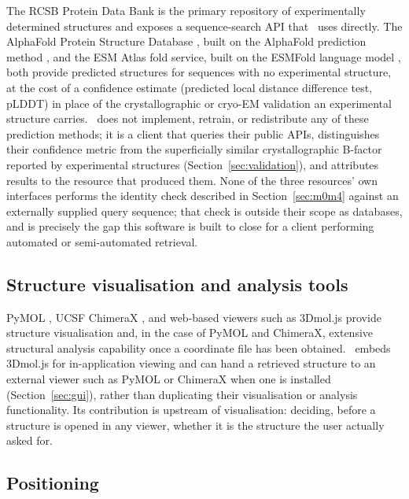The RCSB Protein Data Bank \citep{berman2000pdb} is the primary repository of
experimentally determined structures and exposes a sequence-search API that
\bsi\ uses directly. The AlphaFold Protein Structure Database
\citep{varadi2022alphafolddb}, built on the AlphaFold prediction method
\citep{jumper2021alphafold}, and the ESM Atlas fold service, built on the
ESMFold language model \citep{lin2023esmfold}, both provide predicted
structures for sequences with no experimental structure, at the cost of a
confidence estimate (predicted local distance difference test, pLDDT) in
place of the crystallographic or cryo-EM validation an experimental
structure carries. \bsi\ does not implement, retrain, or redistribute any of
these prediction methods; it is a client that queries their public APIs,
distinguishes their confidence metric from the superficially similar
crystallographic B-factor reported by experimental structures
(Section~\ref{sec:validation}), and attributes results to the resource that
produced them. None of the three resources' own interfaces performs the
identity check described in Section~\ref{sec:m0m4} against an
externally supplied query sequence; that check is outside their scope as
databases, and is precisely the gap this software is built to close for a
client performing automated or semi-automated retrieval.

\subsection{Structure visualisation and analysis tools}

PyMOL \citep{pymol}, UCSF ChimeraX \citep{pettersen2021chimerax}, and web-based
viewers such as 3Dmol.js \citep{rego20153dmol} provide structure
visualisation and, in the case of PyMOL and ChimeraX, extensive structural
analysis capability once a coordinate file has been obtained. \bsi\ embeds
3Dmol.js for in-application viewing and can hand a retrieved structure to an
external viewer such as PyMOL or ChimeraX when one is installed
(Section~\ref{sec:gui}), rather than duplicating their visualisation or
analysis functionality. Its contribution is upstream of visualisation:
deciding, before a structure is opened in any viewer, whether it is the
structure the user actually asked for.

\subsection{Positioning}

